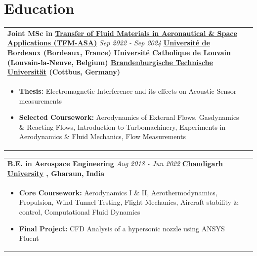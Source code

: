 \documentclass[a4paper,8pt]{article}
\newcommand{\ulhref}[2]{%
  {\hypersetup{urlcolor=.}\textcolor{.}{\href{#1}{\uline{#2}}}}%
}
\begin{document}
\section{Education}
\begin{tabularx}{\linewidth}{@{}X r@{}}
\textbf{Joint MSc in \ulhref{https://tfmasa.eu/}{Transfer of Fluid Materials in Aeronautical \& Space Applications (TFM-ASA)}} \hfill \color[HTML]{371e77} \textit{Sep 2022 - Sep 2024}
\newline
\color[HTML]{371e77}\textbf{\ulhref{https://www.u-bordeaux.fr/}{Université de Bordeaux} (Bordeaux, France) \ulhref{https://www.uclouvain.be/fr}{Université Catholique de Louvain} (Louvain-la-Neuve, Belgium) \ulhref{https://www.b-tu.de/en/}{Brandenburgische Technische Universität} (Cottbus, Germany)}\ \hfill \color[HTML]{4B28A4}  \\[1pt]
\begin{minipage}[t]{\linewidth}
    \begin{itemize}[nosep,after=\strut, leftmargin=*, itemsep=1pt]
        \item \textbf{Thesis:} Electromagnetic Interference and its effects on Acoustic Sensor measurements
        \item \textbf{Selected Coursework:} Aerodynamics of External Flows, Gasdynamics \& Reacting Flows, Introduction to Turbomachinery, Experiments in Aerodynamics \& Fluid Mechanics, Flow Measurements
    \end{itemize}
\end{minipage}
\end{tabularx}

\begin{tabularx}{\linewidth}{@{}X r@{}}
\textbf{B.E. in Aerospace Engineering} \hfill \color[HTML]{371e77} \textit{Aug 2018 - Jun 2022}
\newline
\color[HTML]{371e77}\textbf{\ulhref{https://www.cuchd.in/engineering/be-aerospace.php?L_mx_Visit_Source=www.cuchd.in/}{Chandigarh University}, Gharaun, India}\ \hfill \color[HTML]{4B28A4}  \\[1pt]
\begin{minipage}[t]{\linewidth}
    \begin{itemize}[nosep,after=\strut, leftmargin=*, itemsep=1pt]
        \item \textbf{Core Coursework:} Aerodynamics I \& II, Aerothermodynamics, Propulsion, Wind Tunnel Testing, Flight Mechanics, Aircraft stability \& control, Computational Fluid Dynamics
        \item \textbf{Final Project:} CFD Analysis of a hypersonic nozzle using ANSYS Fluent
    \end{itemize}
\end{minipage}
\end{tabularx}
\end{document}
